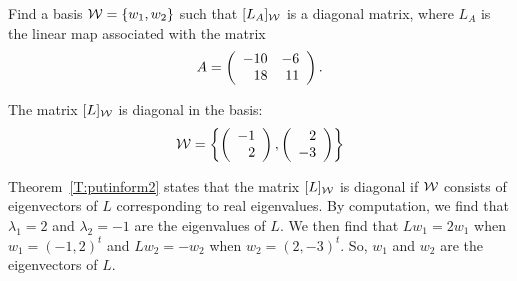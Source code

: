 \documentclass{ximera}
\begin{document}
\begin{exercise} \label{c7.3.4}
Find a basis ${\cal W}=\{w_1,w_2\}$ such that $[L_A]_{\cal W}$ is
a diagonal matrix, where $L_A$ is the linear map associated with the
matrix
\[
A = \left(\begin{array}{rr} -10 & -6\\ 18 &11\end{array}\right).
\]

\begin{solution}

\ans The matrix $[L]_{\cal W}$ is diagonal in the basis:
\[
{\cal W} = \left\{\left(\begin{array}{r} -1 \\ 2\end{array}\right),\left(\begin{array}{r} 2 \\ -3\end{array}\right)\right\}
\]

\soln Theorem~\ref{T:putinform2} states
that the matrix $[L]_{\cal W}$ is diagonal if ${\cal W}$ consists of
eigenvectors of $L$ corresponding to real eigenvalues.  By
computation, we find that $\lambda_1 = 2$ and $\lambda_2 = -1$ are
the eigenvalues of $L$.  We then find that $Lw_1 = 2w_1$ when
$w_1 = (-1,2)^t$ and $Lw_2 = -w_2$ when $w_2 = (2,-3)^t$.  So, $w_1$ and
$w_2$ are the eigenvectors of $L$.
\end{solution}
\end{exercise}
\end{document}
